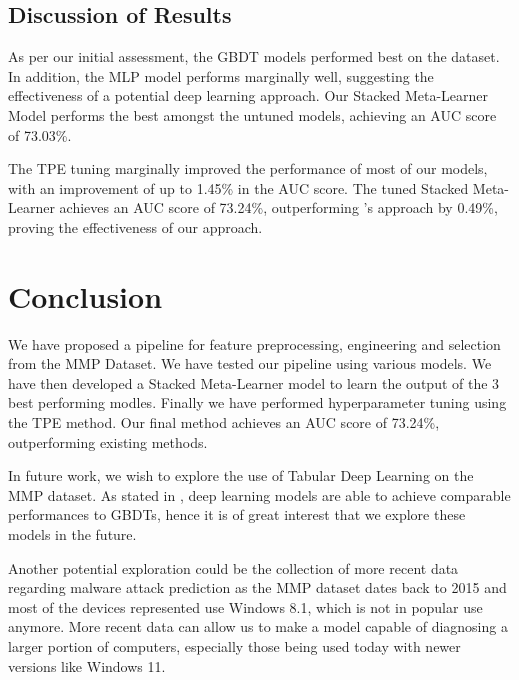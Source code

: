 \documentclass[pdflatex,sn-basic,10pt]{sn-jnl}%
\begin{document}
\subsection{Discussion of Results}\label{subsec:discussion-of-results}

As per our initial assessment, the GBDT models performed best on the dataset. In addition, the MLP model performs marginally well, suggesting the effectiveness of a potential deep learning approach. Our Stacked Meta-Learner Model performs the best amongst the untuned models, achieving an AUC score of 73.03\%.

The TPE tuning marginally improved the performance of most of our models, with an improvement of up to 1.45\% in the AUC score. The tuned Stacked Meta-Learner achieves an AUC score of 73.24\%, outperforming \cite{shahini2019}'s approach by 0.49\%, proving the effectiveness of our approach.

\section{Conclusion}\label{sec:conclusion}

We have proposed a pipeline for feature preprocessing, engineering and selection from the MMP Dataset. We have tested our pipeline using various models. We have then developed a Stacked Meta-Learner model to learn the output of the 3 best performing modles. Finally we have performed hyperparameter tuning using the TPE method. Our final method achieves an AUC score of 73.24\%, outperforming existing methods.


In future work, we wish to explore the use of Tabular Deep Learning on the MMP dataset. As stated in \cite{mcelfresh2023neural}, deep learning models are able to achieve comparable performances to GBDTs, hence it is of great interest that we explore these models in the future.

Another potential exploration could be the collection of more recent data regarding malware attack prediction as the MMP dataset dates back to 2015 and most of the devices represented use Windows 8.1, which is not in popular use anymore. More recent data can allow us to make a model capable of diagnosing a larger portion of computers, especially those being used today with newer versions like Windows 11.
\end{document}
